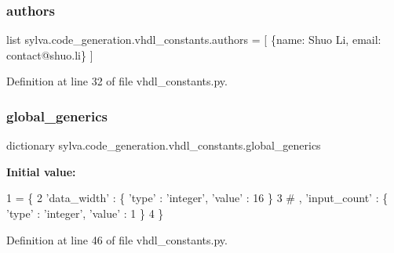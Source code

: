 \mbox{\label{namespacesylva_1_1code__generation_1_1vhdl__constants_a72f8afbb7160fba2099c3cfce5067148}} 
\subsubsection{\texorpdfstring{authors}{authors}}
{\footnotesize\ttfamily list sylva.\+code\+\_\+generation.\+vhdl\+\_\+constants.\+authors = \mbox{[} \{\textquotesingle{}name\textquotesingle{}\+: \textquotesingle{}Shuo Li\textquotesingle{}, \textquotesingle{}email\textquotesingle{}\+: \textquotesingle{}contact@shuo.\+li\textquotesingle{}\} \mbox{]}}



Definition at line 32 of file vhdl\+\_\+constants.\+py.

\mbox{\label{namespacesylva_1_1code__generation_1_1vhdl__constants_ac7c713d1ce70d2a383d55a7b6dcc1d84}} 
\subsubsection{\texorpdfstring{global\+\_\+generics}{global\_generics}}
{\footnotesize\ttfamily dictionary sylva.\+code\+\_\+generation.\+vhdl\+\_\+constants.\+global\+\_\+generics}

{\bfseries Initial value\+:}
\begin{DoxyCode}
1 =  \{
2                   \textcolor{stringliteral}{'data\_width'} : \{ \textcolor{stringliteral}{'type'} : \textcolor{stringliteral}{'integer'}, \textcolor{stringliteral}{'value'} : 16 \}
3                   \textcolor{comment}{# , 'input\_count' : \{ 'type' : 'integer', 'value' : 1 \}}
4                   \}
\end{DoxyCode}


Definition at line 46 of file vhdl\+\_\+constants.\+py.

